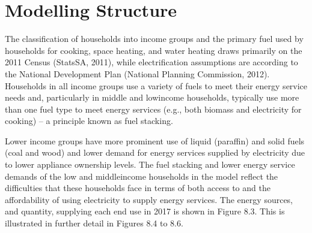 \documentclass[letterpaper,10pt,english]{jupyterBook}
\begin{document}
\sphinxAtStartPar
{}


\section{Modelling Structure}
\label{\detokenize{08Residential:modelling-structure}}
\sphinxAtStartPar
The classification of households into income groups and the primary fuel used by households for cooking, space heating, and water heating draws primarily on the 2011 Census (StatsSA, 2011), while electrification assumptions are according to the National Development Plan (National Planning Commission, 2012). Households in all income groups use a variety of fuels to meet their energy service needs and, particularly in middle\sphinxhyphen{} and low\sphinxhyphen{}income households, typically use more than one fuel type to meet energy services (e.g., both biomass and electricity for cooking) – a principle known as fuel stacking.

\sphinxAtStartPar
Lower income groups have more prominent use of liquid (paraffin) and solid fuels (coal and wood) and lower demand for energy services supplied by electricity due to lower appliance ownership levels. The fuel stacking and lower energy service demands of the low\sphinxhyphen{} and middle\sphinxhyphen{}income households in the model reflect the difficulties that these households face in terms of both access to and the affordability of using electricity to supply energy services. The energy sources, and quantity, supplying each end use in 2017 is shown in Figure 8.3. This is illustrated in further detail in Figures 8.4 to 8.6.

\sphinxAtStartPar
{}
\end{document}
